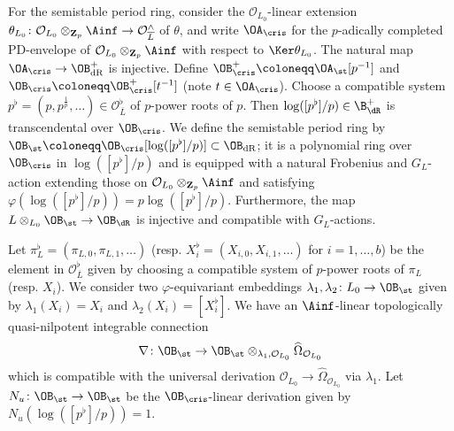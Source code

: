 For the semistable period ring, consider the $\mathcal{O}_{L_0}$-linear extension $\theta_{L_0}\colon \mathcal{O}_{L_0}\otimes_{\mathbf{Z}_p} \Ainf \rightarrow \mathcal{O}_{\overline{L}}^{\wedge}$ of $\theta$, and write $\OA_{\cris}$ for the $p$-adically completed PD-envelope of $\mathcal{O}_{L_0}\otimes_{\mathbf{Z}_p} \Ainf$ with respect to $\Ker \theta_{L_0}$. The natural map $\OA_{\cris} \rightarrow \OB_{\mathrm{dR}}^{+}$ is injective. 
Define $\OB_{\cris}^{+} \coloneqq \OA_{\st}[p^{-1}]$ and $\OB_{\cris} \coloneqq \OB_{\cris}^{+}[t^{-1}]$ (note $t \in \OA_{\cris}$).
Choose a compatible system $p^{\flat} = (p, p^{\frac{1}{p}}, \ldots) \in \mathcal{O}_{\overline{L}}^{\flat}$ of $p$-power roots of $p$. Then $\operatorname{log}([p^{\flat}]/p)\in\B_{\dR}^{+}$ is transcendental over $\OB_{\cris}$. We define the semistable period ring by  $\OB_{\st} \coloneqq \OB_{\cris}[\operatorname{log}([p^{\flat}]/p)] \subset \OB_{\mathrm{dR}}$; it is a polynomial ring over $\OB_{\cris}$ in $\operatorname{log}([p^{\flat}]/p)$ and is equipped with a natural Frobenius and $G_L$-action extending those on $\mathcal{O}_{L_0}\otimes_{\mathbf{Z}_p} \Ainf$ and satisfying $\varphi(\operatorname{log}([p^{\flat}]/p))=p\operatorname{log}([p^{\flat}]/p)$. Furthermore, the map $L\otimes_{L_0} \OB_{\st} \rightarrow \OB_{\dR}$ is injective and compatible with $G_L$-actions.

Let $\pi_L^{\flat} = (\pi_{L, 0}, \pi_{L, 1}, \ldots)$ (resp. $X_i^{\flat} = (X_{i, 0}, X_{i, 1}, \ldots)$ for $i = 1, \ldots, b$) be the element in $\mathcal{O}_{\overline{L}}^{\flat}$ given by choosing a compatible system of $p$-power roots of $\pi_L$ (resp. $X_i$). We consider two $\varphi$-equivariant embeddings $\lambda_1, \lambda_2\colon L_0 \rightarrow \OB_{\st}$ given by $\lambda_1(X_i) = X_i$ and $\lambda_2(X_i) = [X_i^{\flat}]$. We have an $\Ainf$-linear topologically quasi-nilpotent integrable connection 
\[
\nabla\colon \OB_{\st} \rightarrow \OB_{\st}\otimes_{\lambda_1, \mathcal{O}_{L_0}} \widehat{\Omega}_{\mathcal{O}_{L_0}}
\]
which is compatible with the universal derivation $\mathcal{O}_{L_0} \rightarrow \widehat{\Omega}_{\mathcal{O}_{L_0}}$ via $\lambda_1$. Let $N_u\colon \OB_{\st} \rightarrow \OB_{\st}$ be the $\OB_{\cris}$-linear derivation given by $N_u(\operatorname{log}([p^{\flat}]/p)) = 1$. 

